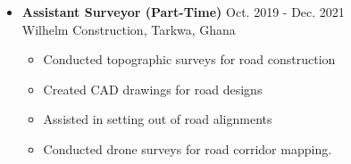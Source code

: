 \documentclass[a4paper,10pt]{article}
\begin{document}
\begin{itemize}[leftmargin=*, noitemsep]
    \item \textbf{Assistant Surveyor (Part-Time)} \hfill Oct. 2019 {-} Dec. 2021 \\
    Wilhelm Construction, Tarkwa, Ghana
    \begin{itemize}[noitemsep]
        \item Conducted topographic surveys for road construction
        \item Created CAD drawings for road designs
        \item Assisted in setting out of road alignments
        \item Conducted drone surveys for road corridor mapping. %
    \end{itemize}
\end{itemize}

\end{document}
